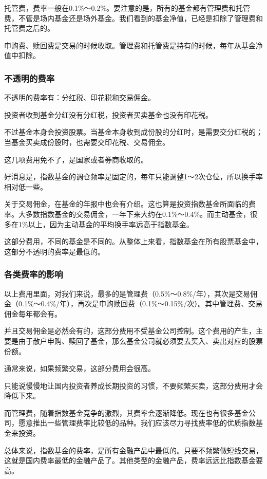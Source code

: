 托管费，费率一般在0.1\%～0.2\%。要注意的是，所有的基金都有管理费和托管费，不管是场内基金还是场外基金。我们看到的基金净值，已经是扣除了管理费和托管费之后的。

申购费、赎回费是交易的时候收取。管理费和托管费是持有的时候，每年从基金净值中扣除。

\subsubsection{不透明的费率}

不透明的费率有：分红税、印花税和交易佣金。

投资者收到基金分红没有分红税，投资者买卖基金也没有印花税。

不过基金本身会投资股票。当基金本身收到成份股的分红时，是需要交分红税的；当基金买卖成份股时，也需要交印花税、交易佣金。

这几项费用免不了，是国家或者券商收取的。

好消息是，指数基金的调仓频率是固定的，每年只能调整1～2次仓位，所以换手率相对低一些。

关于交易佣金，在基金的年报中也会有介绍。这也算是投资指数基金所面临的费率。大多数指数基金的交易佣金，一年下来大约在0.1\%～0.4\%。而主动基金，很多在1\%以上，因为主动基金的平均换手率远高于指数基金。

这部分费用，不同的基金是不同的。从整体上来看，指数基金在所有股票基金中，这部分不透明的费率是最低的。

\subsubsection{各类费率的影响}

以上费用里面，对我们来说，最多的是管理费（0.5\%～0.8\%/年），其次是交易佣金（0.1\%～0.4\%/年），再次是申购赎回费（0.1\%～0.15\%/次）。其中管理费、交易佣金每年都会有。

并且交易佣金是必然会有的，这部分费用不受基金公司控制。这个费用的产生，主要是由于散户申购、赎回了基金，那么基金公司就必须要去买入、卖出对应的股票份额。

通常来说，如果频繁交易，这部分费用会很高。

只能说慢慢地让国内投资者养成长期投资的习惯，不要频繁买卖，这部分费用才会降低下来。

而管理费，随着指数基金竞争的激烈，其费率会逐渐降低。现在也有很多基金公司，愿意推出一些管理费率比较低的品种。我们应该尽力寻找费率低的优质指数基金来投资。

总体来说，指数基金的费率，是所有金融产品中最低的。只要不频繁做短线交易，这就是国内费率最低的金融产品了。其他类型的金融产品，费率远远比指数基金要高。

